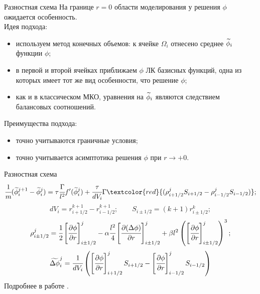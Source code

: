 \begin{frame}{Разностная схема}
На границе $r = 0$ области моделирования у решения $\phi$ ожидается особенность. \\
Идея подхода:
\begin{itemize}
	\item используем метод конечных объемов: к ячейке $\Omega_i$ отнесено среднее ${\widetilde{\phi}}_i$ функции $\phi$;
	\item в первой и второй ячейках приближаем $\phi$ ЛК базисных функций, одна из которых имеет тот же вид особенности, что решение $\phi$;
	\item как и в классическом МКО, уравнения на ${\widetilde{\phi}}_i$ являются следствием балансовых соотношений.
\end{itemize}
Преимущества подхода:
\begin{itemize}
	\item точно учитываются граничные условия;
	\item точно учитывается асимптотика решения $\phi$ при $r \to +0$.
\end{itemize}
\end{frame}


\begin{frame}{Разностная схема}
$$\cfrac{1}{m} (\avphi_i^{j + 1} - \avphi_i^j) = \tau \cfrac{\Gamma}{l^2} f'(\avphi_i^j) + \cfrac{\tau}{dV_i} \Gamma \textcolor{red}{(\rho_{i + 1/2}^j S_{i + 1/2} - \rho_{i - 1/2}^j S_{i - 1/2})};$$
$$dV_i = r_{i + 1/2}^{k + 1} - r_{i - 1/2}^{k + 1}; \qquad S_{i \pm 1/2} = (k + 1) r_{i \pm 1/2}^k;$$
$$\rho_{i \pm 1/2}^j = \cfrac{1}{2} \left[ \cfrac{\partial \phi}{\partial r} \right]_{i \pm 1/2}^j - \alpha \cfrac{l^2}{4} \left[ \cfrac{\partial (\Delta \phi)}{\partial r} \right]_{i \pm 1/2}^j + \beta l^2 \left( \left[ \cfrac{\partial \phi}{\partial r} \right]_{i \pm 1/2}^j \right)^3;$$
$$\widetilde{\Delta \phi}_i^j = \cfrac{1}{dV_i} \left( \left[ \cfrac{\partial \phi}{\partial r} \right]_{i + 1/2}^j S_{i + 1/2} - \left[ \cfrac{\partial \phi}{\partial r} \right]_{i - 1/2}^j S_{i - 1/2} \right)$$
Подробнее в работе \cite{ponomarev_finite_volumes}.
\end{frame}


